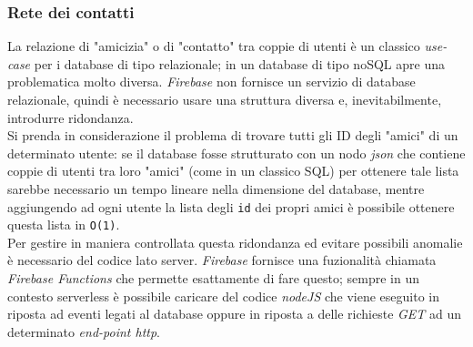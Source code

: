 \documentclass[conference]{IEEEtran}
\begin{document}
		\subsubsection{Rete dei contatti}
			La relazione di "amicizia" o di "contatto" tra coppie di utenti è un classico \textit{use-case} per i database di tipo
			relazionale; in un database di tipo noSQL apre una problematica molto diversa. \textit{Firebase} non fornisce
			un servizio di database relazionale, quindi è necessario usare una struttura diversa e, inevitabilmente, introdurre
			ridondanza.\\
			Si prenda in considerazione il problema di trovare tutti gli ID degli "amici" di un determinato utente:
			se il database fosse strutturato con un nodo \textit{json} che contiene coppie di utenti tra loro "amici" (come in un classico SQL)
			per ottenere tale lista sarebbe necessario un tempo lineare nella dimensione del database, mentre aggiungendo ad ogni utente
			la lista degli \texttt{id}	 dei propri amici è possibile ottenere questa lista in \texttt{O(1)}.\\
			Per gestire in maniera controllata questa ridondanza ed evitare possibili anomalie è necessario del codice
			lato server. \textit{Firebase} fornisce una fuzionalità chiamata \textit{Firebase Functions} che permette esattamente
			di fare questo; sempre in un contesto serverless è possibile caricare del codice \textit{nodeJS} che viene eseguito
			in riposta ad eventi legati al database oppure in riposta a delle richieste \textit{GET} ad un determinato 
			\textit{end-point http}.
\end{document}
